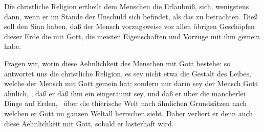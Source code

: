\begin{aufza}
\item Die christliche Religion ertheilt dem Menschen die Erlaubniß, sich, wenigstens dann, wenn er im Stande der Unschuld sich befindet, als das  zu betrachten. Dieß soll den Sinn haben, daß der Mensch vorzugsweise vor allen übrigen Geschöpfen dieser Erde die  mit Gott, die meisten Eigenschaften und Vorzüge mit ihm gemein habe.
\item Fragen wir, worin diese Aehnlichkeit des Menschen mit Gott bestehe: so antwortet uns die christliche Religion, es sey nicht etwa die Gestalt des Leibes, welche der Mensch mit Gott gemein hat; sondern nur darin sey der Mensch Gott ähnlich, , daß er  daß ihm ein  eingeräumt sey, und daß er über die mancherlei Dinge auf Erden, \zB\ über die thierische Welt nach ähnlichen Grundsätzen  nach welchen er Gott im ganzen Weltall herrschen sieht. Daher verliert er denn auch diese Aehnlichkeit mit Gott, sobald er lasterhaft wird.~
\end{aufza}

